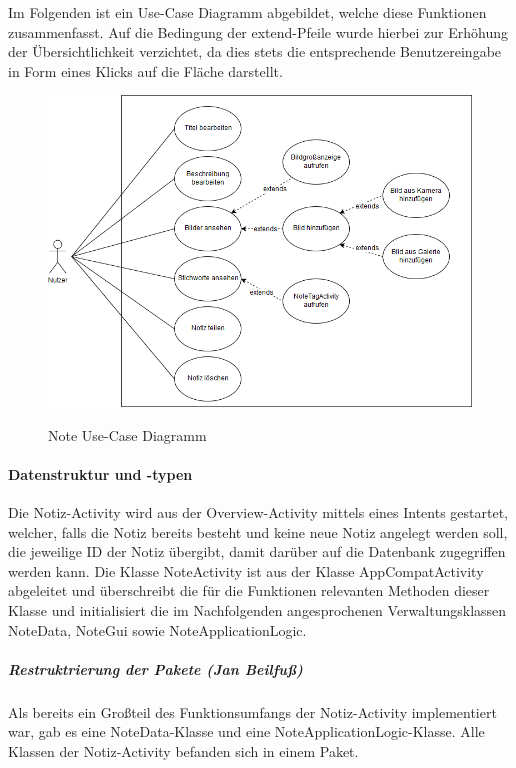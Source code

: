 Im Folgenden ist ein Use-Case Diagramm abgebildet, welche diese Funktionen zusammenfasst. Auf die Bedingung der extend-Pfeile wurde hierbei zur Erhöhung der Übersichtlichkeit verzichtet, da dies stets die entsprechende Benutzereingabe in Form eines Klicks auf die Fläche darstellt.

\begin{figure}[H]
\centering
\begin{minipage}[t]{1\textwidth} %
\caption{Note Use-Case Diagramm} %
\includegraphics[width=1 \textwidth]{img/noteUseCase}\\ %
\end{minipage}
\end{figure}

\paragraph{Datenstruktur und -typen}
Die Notiz-Activity wird aus der Overview-Activity mittels eines Intents gestartet, welcher, falls die Notiz bereits besteht und keine neue Notiz angelegt werden soll, die jeweilige ID der Notiz übergibt, damit darüber auf die Datenbank zugegriffen werden kann. Die Klasse NoteActivity ist aus der Klasse AppCompatActivity abgeleitet und überschreibt die für die Funktionen relevanten Methoden dieser Klasse und initialisiert die im Nachfolgenden angesprochenen Verwaltungsklassen NoteData, NoteGui sowie NoteApplicationLogic.

\subparagraph{Restruktrierung der Pakete (Jan Beilfuß)}
Als bereits ein Großteil des Funktionsumfangs der Notiz-Activity implementiert war, gab es eine NoteData-Klasse und eine NoteApplicationLogic-Klasse. Alle Klassen der Notiz-Activity befanden sich in einem Paket.

